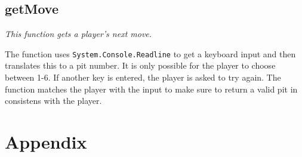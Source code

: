 \documentclass[a4paper]{report}
\begin{document}
\subsection*{getMove} 
{\it This function gets a player's next move.}

The function uses \texttt{System.Console.Readline} to get a keyboard input and then translates this to a pit number. It is only possible for the player to choose between 1-6. If another key is entered, the player is asked to try again. The function matches the player with the input to make sure to return a valid pit in consistens with the player.

\section*{Appendix}
\lstset{language=FSharp}

\end{document}

